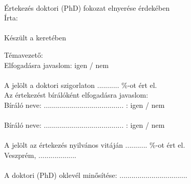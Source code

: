 \thispagestyle{plain}
\begin{center}
    {\fontsize{14}{8}\textbf{\textsc{\mytitle}}} \\[1cm]
    Értekezés doktori (PhD) fokozat elnyerése érdekében\\[0.3cm]
    Írta:\\
    {\textbf \myauthor}\\[0.3cm]
    Készült a \myuni \myschool keretében \\[0.3cm]
\end{center}
Témavezető: \mysupervisor \\
Elfogadásra javaslom: igen / nem\\
\\[0.7cm]
A jelölt a doktori szigorlaton ........... \%-ot ért el. \\[1cm]
Az értekezést bírálóként elfogadásra javaslom: \\[0.3cm]
Bíráló neve: ........................................ : igen / nem\\
\\[0.7cm]
Bíráló neve: ........................................ : igen / nem\\
\\[0.7cm]
A jelölt az értekezés nyilvános vitáján ........... \%-ot ért el.\\
Veszprém, ...................\\[0.5cm]
\\[1cm]
A doktori (PhD) oklevél minősítése: ..................................\\[1cm]
\\



\newpage 